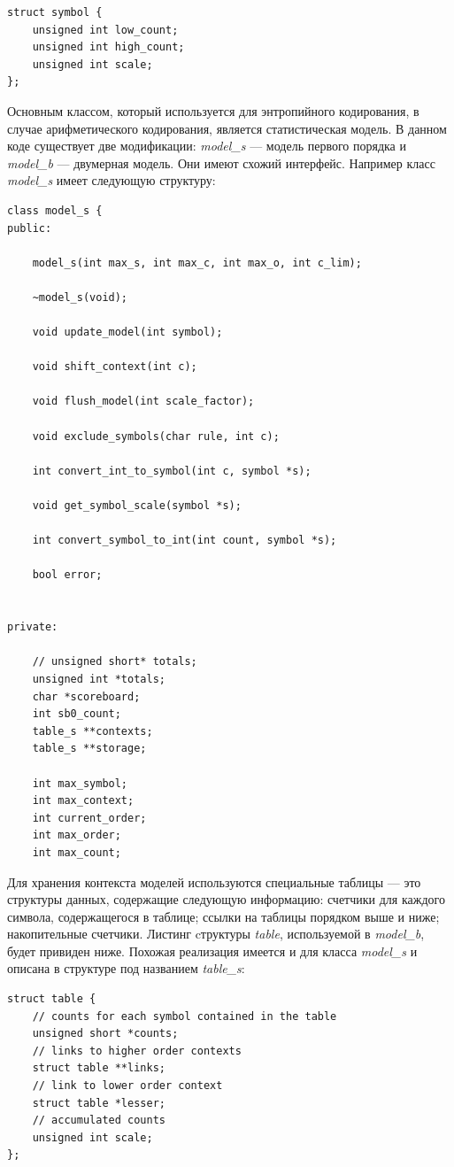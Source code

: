 \documentclass{matmex-diploma-custom}
\begin{document}
\begin{lstlisting}
struct symbol {
    unsigned int low_count;
    unsigned int high_count;
    unsigned int scale;
};
\end{lstlisting}

Основным классом, который используется для энтропийного кодирования, в случае арифметического кодирования, является статистическая модель. В данном коде существует две модификации: \emph{model\_s} --- модель первого порядка и \emph{model\_b} --- двумерная модель. Они имеют схожий интерфейс. Например класс \emph{model\_s} имеет следующую структуру:

\begin{lstlisting}
class model_s {
public:

    model_s(int max_s, int max_c, int max_o, int c_lim);

    ~model_s(void);

    void update_model(int symbol);

    void shift_context(int c);

    void flush_model(int scale_factor);

    void exclude_symbols(char rule, int c);

    int convert_int_to_symbol(int c, symbol *s);

    void get_symbol_scale(symbol *s);

    int convert_symbol_to_int(int count, symbol *s);

    bool error;


private:

    // unsigned short* totals;
    unsigned int *totals;
    char *scoreboard;
    int sb0_count;
    table_s **contexts;
    table_s **storage;

    int max_symbol;
    int max_context;
    int current_order;
    int max_order;
    int max_count;
\end{lstlisting}

Для хранения контекста моделей используются специальные таблицы --- это структуры данных, содержащие следующую информацию: счетчики для каждого символа, содержащегося в таблице; ссылки на таблицы порядком выше и ниже; накопительные счетчики. Листинг cтруктуры \emph{table}, используемой в \emph{model\_b}, будет привиден ниже. Похожая реализация имеется и для класса \emph{model\_s} и описана в структуре под названием \emph{table\_s}:

\begin{lstlisting}
struct table {
    // counts for each symbol contained in the table
    unsigned short *counts;
    // links to higher order contexts
    struct table **links;
    // link to lower order context
    struct table *lesser;
    // accumulated counts
    unsigned int scale;
};
\end{lstlisting}
\end{document}
